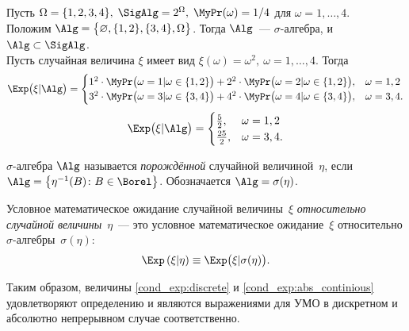     \vspace{5mm}
    \begin{exmp}
        Пусть $\Omega = \{1, 2, 3, 4\}, \; \SigAlg = 2^{\Omega}, \; \MyPr(\omega) = 1/4$ для $\omega = 1, \ldots, 4$. \\
        Положим $\Alg = \bigl\{ \varnothing, \{1, 2\}, \{3, 4\}, \Omega \bigr\}$. 
        Тогда $\Alg$~--- $\sigma$-алгебра, и $\Alg \subset \SigAlg$. \\
        Пусть случайная величина $\xi$ имеет вид $\xi(\omega) = \omega^2, \: \omega = 1, \ldots, 4$.
        Тогда 
        \begin{equation*}
            \Exp \bigl( \xi | \Alg \bigr) = \begin{cases}
                1^2 \cdot \MyPr\bigl(\omega = 1 | \omega \in \{1, 2\}\bigr) + 2^2 \cdot \MyPr\bigl(\omega = 2 | \omega \in \{1, 2\}\bigr), & \omega = 1, 2\\
                3^2 \cdot \MyPr\bigl(\omega = 3 | \omega \in \{3, 4\}\bigr) + 4^2 \cdot \MyPr\bigl(\omega = 4 | \omega \in \{3, 4\}\bigr), & \omega = 3, 4.
            \end{cases}
        \end{equation*}
        \begin{equation*}
            \Exp \bigl( \xi | \Alg \bigr) = \begin{cases}
                \frac{5}{2}, & \omega = 1, 2\\
                \frac{25}{2}, & \omega = 3, 4.
            \end{cases}
        \end{equation*}
        
    \end{exmp}

    \vspace{5mm}
    \begin{defn}
        $\sigma$-алгебра $\Alg$ называется \textit{порождённой} случайной величиной~$\eta$, если $\Alg = \bigl\{ \eta^{-1}(B)\colon B \in \Borel \bigr\} $.
        Обозначается $\Alg = \sigma(\eta)$.
    \end{defn}

    \begin{defn}
        Условное математическое ожидание случайной величины~$\xi$ \textit{относительно случайной величины}~$\eta$~--- 
        это условное математическое ожидание~$\xi$ относительно $\sigma$-алгебры~$\sigma(\eta)$:
        \begin{equation*}
            \Exp \left( \xi | \eta \right) \equiv \Exp \bigl( \xi | \sigma(\eta) \bigr).
        \end{equation*}
    \end{defn}
    Таким образом, величины \ref{cond_exp:discrete} и \ref{cond_exp:abs_continious} удовлетворяют определению и являются выражениями для УМО в дискретном и абсолютно непрерывном случае соответственно.

